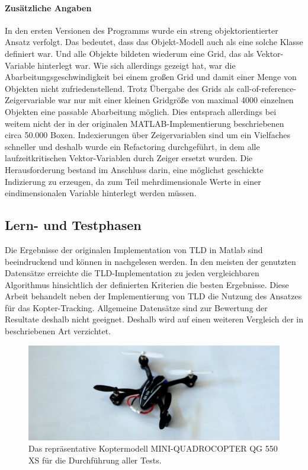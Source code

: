 \paragraph{Zusätzliche Angaben}
In den ersten Versionen des Programms wurde ein streng objektorientierter Ansatz verfolgt. Das bedeutet, dass das Objekt-Modell auch als eine solche Klasse definiert war. Und alle Objekte bildeten wiederum eine Grid, das als Vektor-Variable hinterlegt war. Wie sich allerdings gezeigt hat, war die Abarbeitungsgeschwindigkeit bei einem großen Grid und damit einer Menge von Objekten nicht zufriedenstellend. Trotz Übergabe des Grids als call-of-reference-Zeigervariable war nur mit einer kleinen Gridgröße von maximal 4000 einzelnen Objekten eine passable Abarbeitung möglich. Dies entsprach allerdings bei weitem nicht der in der originalen MATLAB-Implementierung beschriebenen circa 50.000 Boxen. Indexierungen über Zeigervariablen sind um ein Vielfaches schneller und deshalb wurde ein Refactoring durchgeführt, in dem alle laufzeitkritischen Vektor-Variablen durch Zeiger ersetzt wurden. Die Herausforderung bestand im Anschluss darin, eine möglichst geschickte Indizierung zu erzeugen, da zum Teil mehrdimensionale Werte in einer eindimensionalen Variable hinterlegt werden müssen.

\subsection{Lern- und Testphasen}
\label{subsection:learning_and_testing}
Die Ergebnisse der originalen Implementation von TLD in Matlab sind beeindruckend und können in \cite{TLD} nachgelesen werden. In den meisten der genutzten Datensätze erreichte die TLD-Implementation zu jeden vergleichbaren Algorithmus hinsichtlich der definierten Kriterien die besten Ergebnisse. Diese Arbeit behandelt neben der Implementierung von TLD die Nutzung des Ansatzes für das Kopter-Tracking. Allgemeine Datensätze sind zur Bewertung der Resultate deshalb nicht geeignet. Deshalb wird auf einen weiteren Vergleich der in \cite{TLD} beschriebenen Art verzichtet.

\begin{figure}[H]
	\begin{centering}
		\includegraphics[scale=0.6]{../pictures/kopter}
		\caption{Das repräsentative Koptermodell MINI-QUADROCOPTER QG 550 XS für die Durchführung aller Tests.}
		\label{abb:kopter}
		\par
	\end{centering}
\end{figure}

